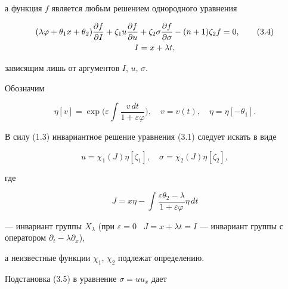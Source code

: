 а функция $f$ является любым решением однородного уравнения 


\begin{gather} 


(\lambda\varphi+\theta_1x+\theta_2)\frac{\partial f}{\partial I}+ 


\zeta_1u\frac{\partial f}{\partial u}+\zeta_2\sigma 


\frac{\partial f}{\partial\sigma}-(n+1)\zeta_2f=0, \tag{3.4}\\ 


I=x+\lambda t,\notag 


\end{gather} 


зависящим лишь от аргументов $I$, $u$, $\sigma$. 


\pagebreak


 


Обозначим 


$$ 


\eta[v]=\exp\bigg(\varepsilon\int\frac{v\,dt} 


{1+\varepsilon\varphi} \bigg),\quad v=v(t),\quad 


\eta=\eta[-\theta_1]. 


$$ 


 


В силу (1.3) инвариантное решение уравнения (3.1) следует искать в виде 


\begin{equation} 


u=\chi_1(J)\eta[\zeta_1],\quad \sigma=\chi_2(J)\eta[\zeta_2],\tag{3.5} 


\end{equation} 


где 


\begin{equation} 


J=x\eta-\int\frac{\varepsilon\theta_2-\lambda}{1+\varepsilon\varphi} 


\eta\,dt \tag{3.6} 


\end{equation} 


--- инвариант группы $X_\lambda$ (при $\varepsilon=0$ \ $J=x+\lambda 


t=I$ --- инвариант группы с оператором $\partial_t-\lambda\partial_x$), 


а неизвестные функции $\chi_1$, $\chi_2$ подлежат определению. 


Подстановка (3.5) в уравнение $\sigma=uu_x$ дает 


